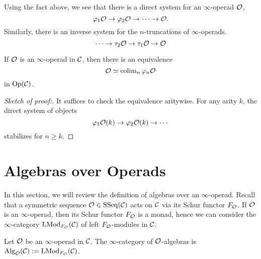\begin{remark}
	Using the fact above, we see that there is a direct system for an $\infty$-operad ${\mathcal{O}}$, 
\begin{equation}
\varphi_1{\mathcal{O}} \to \varphi_2{\mathcal{O}} \to \cdots \to {\mathcal{O}}.
\end{equation}
Similarly, there is an inverse system for the $n$-truncations of $\infty$-operads.
\begin{equation}
\cdots \to 
\tau_2 {\mathcal{O}}
\to 
\tau_1 {\mathcal{O}}
\to 
{\mathcal{O}}
\end{equation}
\end{remark}


\begin{proposition}
\cite{Heuts_Koszul}
\label{Operad as a colimits}
	If ${\mathcal{O}}$ is an $\infty$-operad in ${\mathcal{C}}$, 
	then there is an equivalence
	\[
	{\mathcal{O}} \simeq
	\operatorname{colim}_n \varphi_n {\mathcal{O}}
	\]
	in $\operatorname{Op}({\mathcal{C}})$.
\end{proposition}
\begin{proof}
[Sketch of proof:]
    It suffices to check the equivalence aritywise.
    For any arity $k$, the direct system of objects 
    $$
    \varphi_1{\mathcal{O}}(k) \to \varphi_2{\mathcal{O}}(k) \to \cdots    
    $$
    stabilizes for $n \geq k$.
\end{proof}





\section{Algebras over Operads}
\label{Algebras over Operads}
In this section, we will review the definition of algebras over an $\infty$-operad.
Recall that a symmetric sequence ${\mathcal{O}}\in\operatorname{SSeq}({\mathcal{C}})$ acts on ${\mathcal{C}}$ via its Schur functor $F_{{\mathcal{O}}}$.
If ${\mathcal{O}}$ is an $\infty$-operad, then its Schur functor $F_{\mathcal{O}}$ is a monad, hence we can consider the $\infty$-category $\operatorname{LMod}_{F_{\mathcal{O}}}({\mathcal{C}})$ of left $F_{\mathcal{O}}$-modules in ${\mathcal{C}}$.
\begin{definition}
	\label{algebras over an operad}
	Let ${\mathcal{O}}$ be an $\infty$-operad in ${\mathcal{C}}$. The $\infty$-category of ${\mathcal{O}}$-algebras is $\operatorname{Alg}_{{\mathcal{O}}}({\mathcal{C}}):= \operatorname{LMod}_{F_{\mathcal{O}}}({\mathcal{C}})$.
\end{definition}

